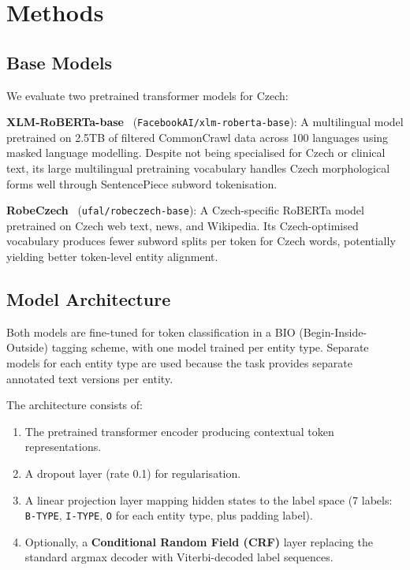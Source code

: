 \documentclass[11pt]{article}
\begin{document}
\section{Methods}

\subsection{Base Models}

We evaluate two pretrained transformer models for Czech:

\textbf{XLM-RoBERTa-base}~\cite{conneau-etal-2020-unsupervised} (\texttt{FacebookAI/xlm-roberta-base}):
A multilingual model pretrained on 2.5TB of filtered CommonCrawl data across 100 languages
using masked language modelling. Despite not being specialised for Czech or clinical text,
its large multilingual pretraining vocabulary handles Czech morphological forms well through
SentencePiece subword tokenisation.

\textbf{RobeCzech}~\cite{straka-strakova-2020-robeczech} (\texttt{ufal/robeczech-base}):
A Czech-specific RoBERTa model pretrained on Czech web text, news, and Wikipedia. Its
Czech-optimised vocabulary produces fewer subword splits per token for Czech words,
potentially yielding better token-level entity alignment.

\subsection{Model Architecture}

Both models are fine-tuned for token classification in a BIO (Begin-Inside-Outside) tagging
scheme, with one model trained per entity type. Separate models for each entity type are
used because the task provides separate annotated text versions per entity.

The architecture consists of:
\begin{enumerate}
  \item The pretrained transformer encoder producing contextual token representations.
  \item A dropout layer (rate 0.1) for regularisation.
  \item A linear projection layer mapping hidden states to the label space (7 labels:
        \texttt{B-TYPE}, \texttt{I-TYPE}, \texttt{O} for each entity type, plus padding label).
  \item Optionally, a \textbf{Conditional Random Field (CRF)} layer replacing the
        standard argmax decoder with Viterbi-decoded label sequences.
\end{enumerate}
\end{document}
